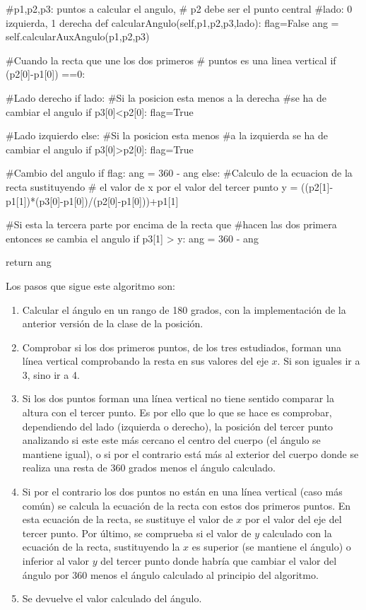 {\begin{python}
#p1,p2,p3: puntos a calcular el angulo,
# p2 debe ser el punto central
#lado: 0 izquierda, 1 derecha
def calcularAngulo(self,p1,p2,p3,lado):
     flag=False
     ang = self.calcularAuxAngulo(p1,p2,p3)
     
     #Cuando la recta que une los dos primeros
     # puntos es una linea vertical
     if (p2[0]-p1[0]) ==0:
         
         #Lado derecho
         if lado:
             #Si la posicion esta menos a la derecha 
             #se ha de cambiar el angulo
             if p3[0]<p2[0]:
                 flag=True
         
         #Lado izquierdo
         else:
             #Si la posicion esta menos 
             #a la izquierda se ha de cambiar el angulo
             if p3[0]>p2[0]:
                 flag=True
         
         #Cambio del angulo
         if flag:
             ang = 360 - ang
     else:
         #Calculo de la ecuacion de la recta sustituyendo
         # el valor de x por el valor del tercer punto
         y = ((p2[1]-p1[1])*(p3[0]-p1[0])/(p2[0]-p1[0]))+p1[1]
         
         #Si esta la tercera parte por encima de la recta que 
         #hacen las dos primera entonces se cambia el angulo
         if p3[1] > y:
             ang = 360 - ang
     
     return ang
\end{python}

Los pasos que sigue este algoritmo son:
\begin{enumerate}
	\item Calcular el ángulo en un rango de 180 grados, con la implementación de la anterior versión de la clase de la posición.
	\item Comprobar si los dos primeros puntos, de los tres estudiados, forman una línea vertical comprobando la resta en sus valores del eje $x$. Si son iguales ir a 3, sino ir a 4.
	\item Si los dos puntos forman una línea vertical no tiene sentido comparar la altura con el tercer punto. Es por ello que lo que se hace es comprobar, dependiendo del lado (izquierda o derecho), la posición del tercer punto analizando si este este más cercano el centro del cuerpo (el ángulo se mantiene igual), o si por el contrario está más al exterior del cuerpo donde se realiza una resta de 360 grados menos el ángulo calculado.
	\item Si por el contrario los dos puntos no están en una línea vertical (caso más común) se calcula la ecuación de la recta con estos dos primeros puntos. En esta ecuación de la recta, se sustituye el valor de $x$ por el valor del eje del tercer punto. Por último, se comprueba si el valor de $y$ calculado con la ecuación de la recta, sustituyendo la $x$ es superior (se mantiene el ángulo) o inferior al valor $y$ del tercer punto donde habría que cambiar el valor del ángulo por 360 menos el ángulo calculado al principio del algoritmo.
	\item Se devuelve el valor calculado del ángulo.
\end{enumerate}

}

